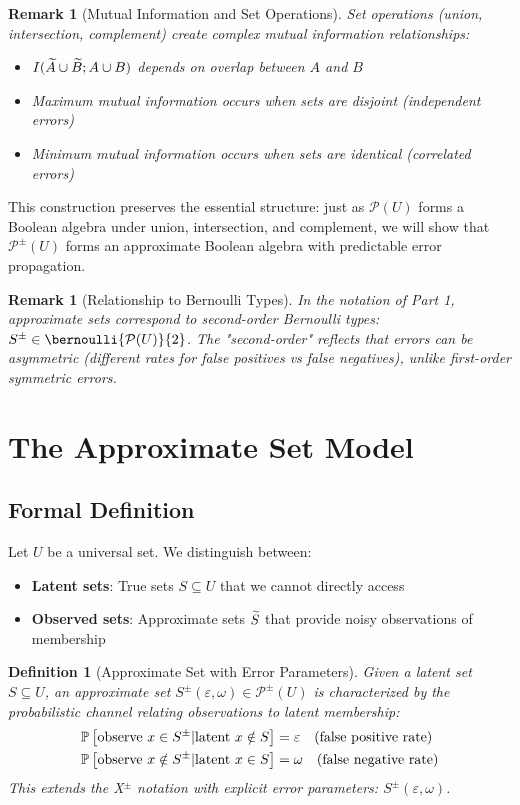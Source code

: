 \documentclass[11pt,final,hidelinks]{article}
\newtheorem{definition}[theorem]{Definition}
\newtheorem{remark}[theorem]{Remark}
\begin{document}
\begin{remark}[Mutual Information and Set Operations]
Set operations (union, intersection, complement) create complex mutual information relationships:
\begin{itemize}
    \item $I(\widetilde{A} \cup \widetilde{B}; A \cup B)$ depends on overlap between $A$ and $B$
    \item Maximum mutual information occurs when sets are disjoint (independent errors)
    \item Minimum mutual information occurs when sets are identical (correlated errors)
\end{itemize}
\end{remark}

This construction preserves the essential structure: just as $\mathcal{P}(U)$ forms a Boolean algebra under union, intersection, and complement, we will show that $\mathcal{P}^{\pm}(U)$ forms an approximate Boolean algebra with predictable error propagation.

\begin{remark}[Relationship to Bernoulli Types]
In the notation of Part 1, approximate sets correspond to second-order Bernoulli types: $S^{\pm} \in \bernoulli{\mathcal{P}(U)}{2}$. The "second-order" reflects that errors can be asymmetric (different rates for false positives vs false negatives), unlike first-order symmetric errors.
\end{remark}

\section{The Approximate Set Model}

\subsection{Formal Definition}

Let $U$ be a universal set. We distinguish between:
\begin{itemize}
    \item \textbf{Latent sets}: True sets $S \subseteq U$ that we cannot directly access
    \item \textbf{Observed sets}: Approximate sets $\widetilde{S}$ that provide noisy observations of membership
\end{itemize}

\begin{definition}[Approximate Set with Error Parameters]
Given a latent set $S \subseteq U$, an approximate set $S^{\pm}(\varepsilon, \omega) \in \mathcal{P}^{\pm}(U)$ is characterized by the probabilistic channel relating observations to latent membership:
\begin{align}
\mathbb{P}\left[\text{observe } x \in S^{\pm} | \text{latent } x \notin S\right] &= \varepsilon \quad \text{(false positive rate)} \\
\mathbb{P}\left[\text{observe } x \notin S^{\pm} | \text{latent } x \in S\right] &= \omega \quad \text{(false negative rate)}
\end{align}
This extends the X$^{\pm}$ notation with explicit error parameters: $S^{\pm}(\varepsilon, \omega)$.
\end{definition}
\end{document}
